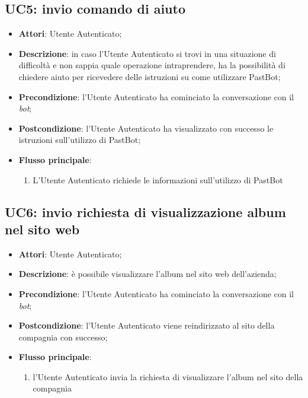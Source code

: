 
\subsection{UC5: invio comando di aiuto}
\label{uc:uc5}
\hypertarget{UC5}{}

\begin{itemize}
  \item \textbf{Attori}: Utente Autenticato;
  \item \textbf{Descrizione}: in caso l'Utente Autenticato si trovi in una
situazione di difficoltà e non sappia quale operazione intraprendere, ha la
possibilità di chiedere aiuto per ricevedere delle istruzioni su come
utilizzare PastBot;
  \item \textbf{Precondizione}: l'Utente Autenticato ha cominciato la
conversazione con il \textit{bot};
  \item \textbf{Postcondizione}: l'Utente Autenticato ha visualizzato con
successo le istruzioni sull'utilizzo di PastBot;
  \item \textbf{Flusso principale}:
  \begin{enumerate}
    \item L'Utente Autenticato richiede le informazioni sull'utilizzo di
PastBot
  \end{enumerate}
\end{itemize}



\subsection{UC6: invio richiesta di visualizzazione album nel sito web}
\label{uc:uc6}
\hypertarget{UC6}{}

\begin{itemize}
  \item \textbf{Attori}: Utente Autenticato;
  \item \textbf{Descrizione}: è possibile visualizzare l'album nel sito web
dell'azienda;
  \item \textbf{Precondizione}: l'Utente Autenticato ha cominciato la
conversazione con il \textit{bot};
  \item \textbf{Postcondizione}: l'Utente Autenticato viene reindirizzato al
sito della compagnia con successo;
  \item \textbf{Flusso principale}:
  \begin{enumerate}
    \item l'Utente Autenticato invia la richiesta di visualizzare l'album nel
sito della compagnia
  \end{enumerate}
\end{itemize}

